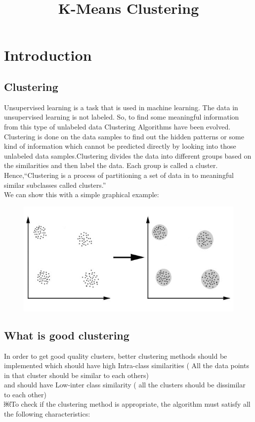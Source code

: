 \documentclass[11pt]{article}
\title{K-Means Clustering}
\begin{document}
\maketitle

\section{Introduction}
\subsection{Clustering}
Unsupervised learning is a task that is used in machine learning. The data in unsupervised learning is not labeled. So, to find some meaningful information from this type of unlabeled data 
Clustering Algorithms have been evolved. Clustering is done on the data samples to find out the hidden patterns or some kind of information which cannot be predicted directly by looking into
those unlabeled data samples.Clustering divides the data into different groups based on the similarities and then label the data. Each group is called a cluster. Hence,``Clustering is a process of partitioning a set of data in to meaningful similar subclasses called clusters.''\\

We can show this with a simple graphical example: 

\begin{figure}
\begin{center}
\includegraphics[scale=0.6]{clustering.jpg}
\end{center}
\end{figure}
\cite{fig_1}

\subsection{What is good clustering}
In order to get good quality clusters, better clustering methods should be implemented which should have high Intra-class similarities ( All the data points in that cluster should be similar to each others) \\
and should have Low-inter class similarity ( all the clusters should be dissimilar to each other)\\
￼To check if the clustering method is appropriate, the algorithm must satisfy all the following characteristics:\\
\end{document}
